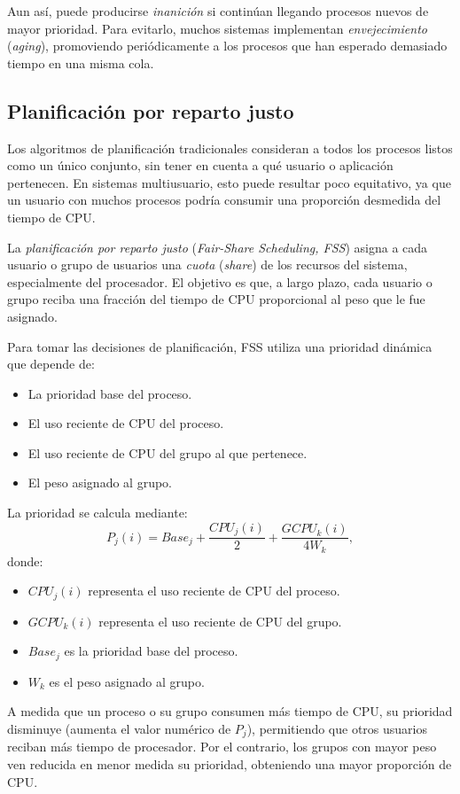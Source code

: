 Aun así, puede producirse \textit{inanición} si continúan llegando procesos nuevos de mayor prioridad. Para evitarlo, muchos sistemas implementan \textit{envejecimiento} (\textit{aging}), promoviendo periódicamente a los procesos que han esperado demasiado tiempo en una misma cola.

\subsection{Planificación por reparto justo}

Los algoritmos de planificación tradicionales consideran a todos los procesos listos como un único conjunto, sin tener en cuenta a qué usuario o aplicación pertenecen. En sistemas multiusuario, esto puede resultar poco equitativo, ya que un usuario con muchos procesos podría consumir una proporción desmedida del tiempo de CPU.

La \textit{planificación por reparto justo} (\textit{Fair-Share Scheduling, FSS}) asigna a cada usuario o grupo de usuarios una \textit{cuota} (\textit{share}) de los recursos del sistema, especialmente del procesador. El objetivo es que, a largo plazo, cada usuario o grupo reciba una fracción del tiempo de CPU proporcional al peso que le fue asignado.

Para tomar las decisiones de planificación, FSS utiliza una prioridad dinámica que depende de:
\begin{itemize}
  \item La prioridad base del proceso.
  \item El uso reciente de CPU del proceso.
  \item El uso reciente de CPU del grupo al que pertenece.
  \item El peso asignado al grupo.
\end{itemize}
La prioridad se calcula mediante:
\[
P_j(i)=Base_j+\frac{CPU_j(i)}{2}+\frac{GCPU_k(i)}{4W_k},
\]
donde:
\begin{itemize}
  \item \(CPU_j(i)\) representa el uso reciente de CPU del proceso.
  \item \(GCPU_k(i)\) representa el uso reciente de CPU del grupo.
  \item \(Base_j\) es la prioridad base del proceso.
  \item \(W_k\) es el peso asignado al grupo.
\end{itemize}

A medida que un proceso o su grupo consumen más tiempo de CPU, su prioridad disminuye (aumenta el valor numérico de \(P_j\)), permitiendo que otros usuarios reciban más tiempo de procesador. Por el contrario, los grupos con mayor peso ven reducida en menor medida su prioridad, obteniendo una mayor proporción de CPU.

